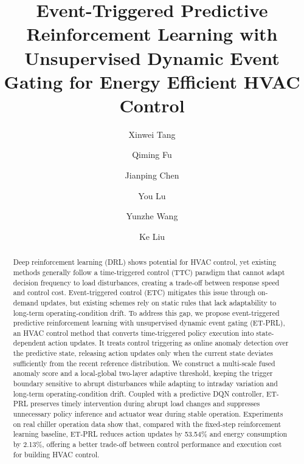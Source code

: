 ﻿\documentclass[preprint,12pt,number]{elsarticle}
\begin{document}
\begin{frontmatter}

\title{Event-Triggered Predictive Reinforcement Learning with Unsupervised Dynamic Event Gating for Energy Efficient HVAC Control}

\author[inst1,inst2]{Xinwei Tang}
\author[inst1,inst2]{Qiming Fu}
\author[inst1,inst2,inst3]{Jianping Chen}
\author[inst1,inst2]{You Lu}
\author[inst1,inst2]{Yunzhe Wang}
\author[inst4]{Ke Liu}

\begin{abstract}
Deep reinforcement learning (DRL) shows potential for HVAC control, yet existing methods generally follow a time-triggered control (TTC) paradigm that cannot adapt decision frequency to load disturbances, creating a trade-off between response speed and control cost. Event-triggered control (ETC) mitigates this issue through on-demand updates, but existing schemes rely on static rules that lack adaptability to long-term operating-condition drift. To address this gap, we propose event-triggered predictive reinforcement learning with unsupervised dynamic event gating (ET-PRL), an HVAC control method that converts time-triggered policy execution into state-dependent action updates. It treats control triggering as online anomaly detection over the predictive state, releasing action updates only when the current state deviates sufficiently from the recent reference distribution. We construct a multi-scale fused anomaly score and a local-global two-layer adaptive threshold, keeping the trigger boundary sensitive to abrupt disturbances while adapting to intraday variation and long-term operating-condition drift. Coupled with a predictive DQN controller, ET-PRL preserves timely intervention during abrupt load changes and suppresses unnecessary policy inference and actuator wear during stable operation. Experiments on real chiller operation data show that, compared with the fixed-step reinforcement learning baseline, ET-PRL reduces action updates by 53.54\% and energy consumption by 2.13\%, offering a better trade-off between control performance and execution cost for building HVAC control.
\end{abstract}


\end{frontmatter}
\end{document}
